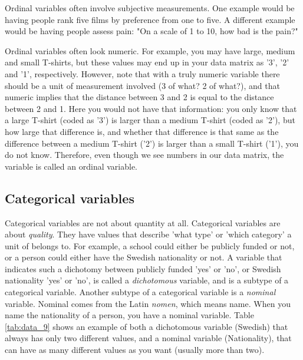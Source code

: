 \documentclass[]{book}\usepackage[]{graphicx}\usepackage[]{color}
\begin{document}
Ordinal variables often involve subjective measurements. One example would be having people rank five films by preference from one to five. A different example would be having people assess pain: "On a scale of 1 to 10, how bad is the pain?"

Ordinal variables often look numeric. For example, you may have large, medium and small T-shirts, but these values may end up in your data matrix as '3', '2' and '1', respectively. However, note that with a truly numeric variable there should be a unit of measurement involved (3 of what? 2 of what?), and that numeric implies that the distance between 3 and 2 is equal to the distance between 2 and 1. Here you would not have that information: you only know that a large T-shirt (coded as '3') is larger than a medium T-shirt (coded as '2'), but how large that difference is, and whether that difference is that same as the difference between a medium T-shirt ('2') is larger than a small T-shirt ('1'), you do not know. Therefore, even though we see numbers in our data matrix, the variable is called an ordinal variable. 


\subsection{Categorical variables}

Categorical variables are not about quantity at all. Categorical variables are about \textit{quality}. They have values that describe 'what type' or 'which category' a unit of belongs to. For example, a school could either be publicly funded or not, or a person could either have the Swedish nationality or not. A variable that indicates such a dichotomy between publicly funded 'yes' or 'no', or Swedish nationality 'yes' or 'no', is called a \textit{dichotomous} variable, and is a subtype of a categorical variable. Another subtype of a categorical variable is a \textit{nominal} variable. Nominal comes from the Latin \textit{nomen}, which means name. When you name the nationality of a person, you have a nominal variable. Table \ref{tab:data_9} shows an example of both a dichotomous variable (Swedish) that always has only two different values, and a nominal variable (Nationality), that can have as many different values as you want (usually more than two).
\end{document}
